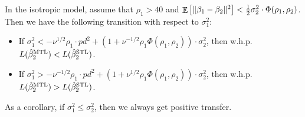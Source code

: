 \begin{proposition}%
\label{prop_var_transition}
	In the isotropic model, assume that $\rho_1 > 40$ and $\mathop{\mathbb{E}}\left[ \|\beta_1 - \beta_2\|^2 \right]< \frac{1}{2} {\sigma_2^2}  \cdot \Phi(\rho_1, \rho_2)$.
	Then we have the following transition with respect to $\sigma_1^2$:
	\begin{itemize}
		\item If $\sigma_1^2 < - \nu^{1/2} \rho_1 \cdot p d^2+\left(1+ \nu^{-1/2}\rho_1 \Phi(\rho_1, \rho_2)\right)\cdot\sigma_2^2$, then w.h.p. $L(\hat{\beta}_2^{\text{MTL}}) < L(\hat{\beta}_2^{\text{STL}})$.
		\item If $\sigma_1^2 > -\nu^{-1/2}\rho_1\cdot p d^2   +\left(1+ \nu^{1/2}\rho_1\Phi(\rho_1, \rho_2)\right) \cdot \sigma_2^2$, then w.h.p. $L(\hat{\beta}_2^{\text{MTL}}) > L(\hat{\beta}_2^{\text{STL}})$.
	\end{itemize}
\end{proposition}
As a corollary, if $\sigma_1^2 \le \sigma_2^2$, then we always get positive transfer.


